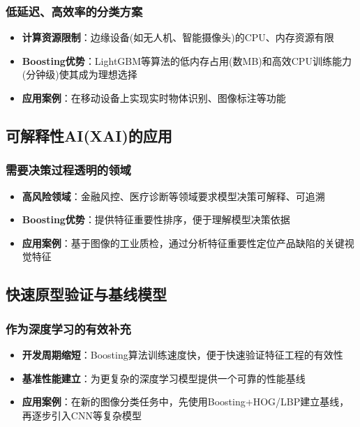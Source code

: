 \documentclass[UTF8]{report}
\theoremstyle{MyLineTheoremStyle} %
\theoremstyle{MyBlockTheoremStyle} %
\theoremstyle{MySubsubsectionStyle} %
\begin{document}
\subsubsection{低延迟、高效率的分类方案}
\begin{itemize}
    \item \textbf{计算资源限制}：边缘设备(如无人机、智能摄像头)的CPU、内存资源有限
    \item \textbf{Boosting优势}：LightGBM等算法的低内存占用(数MB)和高效CPU训练能力(分钟级)使其成为理想选择
    \item \textbf{应用案例}：在移动设备上实现实时物体识别、图像标注等功能
\end{itemize}

\subsection{可解释性AI(XAI)的应用}
\subsubsection{需要决策过程透明的领域}
\begin{itemize}
    \item \textbf{高风险领域}：金融风控、医疗诊断等领域要求模型决策可解释、可追溯
    \item \textbf{Boosting优势}：提供特征重要性排序，便于理解模型决策依据
    \item \textbf{应用案例}：基于图像的工业质检，通过分析特征重要性定位产品缺陷的关键视觉特征
\end{itemize}

\subsection{快速原型验证与基线模型}
\subsubsection{作为深度学习的有效补充}
\begin{itemize}
    \item \textbf{开发周期缩短}：Boosting算法训练速度快，便于快速验证特征工程的有效性
    \item \textbf{基准性能建立}：为更复杂的深度学习模型提供一个可靠的性能基线
    \item \textbf{应用案例}：在新的图像分类任务中，先使用Boosting+HOG/LBP建立基线，再逐步引入CNN等复杂模型
\end{itemize}
\end{document}
